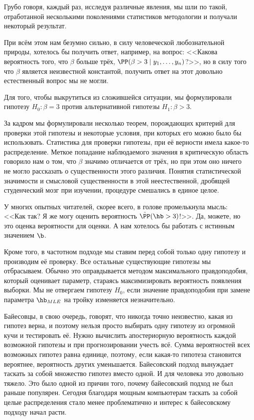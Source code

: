 Грубо говоря, каждый раз, исследуя различные явления, мы шли по такой, отработанной несколькими поколениями статистиков методологии и получали некоторый результат.

При всём этом нам безумно сильно, в силу человеческой любознательной природы, хотелось бы получить ответ, например, на вопрос: <<Какова вероятность того, что $\beta$ больше трёх, $\PP(\beta > 3 \mid y_1, \ldots, y_n)$?>>, но в силу того что $\beta$ является неизвестной константой, получить ответ на этот довольно естественный вопрос мы не могли.

Для того, чтобы выкрутиться из сложившейся ситуации, мы формулировали гипотезу $ H_0 : \beta = 3 $ против альтернативной гипотезы $ H_1 : \beta > 3.$

За кадром мы формулировали  несколько теорем, порождающих критерий для проверки этой гипотезы и некоторые условия, при которых его можно было бы использовать. Статистика для проверки гипотезы, при её верности имела какое-то распределение. Меткое попадание наблюдаемого значения в критическую область говорило нам о том, что $\beta$ значимо отличается от трёх, но при этом оно ничего не могло  рассказать о существенности этого различия. Понятия статистической значимости и смысловой существенности в этой неестественной, дробящей студенческий мозг при изучении, процедуре смешались в единое целое.

У многих опытных читателей, скорее всего, в голове промелькнула мысль: <<Как так? Я же могу оценить вероятность $\hat{\PP} ( \hb > 3)$!>>.  Да, можете, но это оценка вероятности для оценки. А нам хотелось бы работать с истинным значением $\b$.

Кроме того, в частотном подходе мы ставим перед собой только одну гипотезу и производим её проверку. Все остальные существующие гипотезы мы отбрасываем. Обычно это оправдывается методом максимального правдоподобия, который оценивает параметр, стараясь максимизировать вероятность появления выборки. Мы не отвергаем гипотезу $H_0$, если значение правдоподобия при замене параметра $\hb_{MLE}$ на тройку изменяется незначительно.

Байесовцы, в свою очередь, говорят, что никогда точно неизвестно, какая из гипотез верна, и поэтому нельзя просто выбирать одну гипотезу из огромной кучи и тестировать её. Нужно вычислить апостериорную вероятность каждой возможной гипотезы и при прогнозировании учесть всё. Сумма вероятностей всех возможных гипотез равна единице, поэтому, если какая-то гипотеза становится вероятнее, вероятность других уменьшается. Байесовский подход вынуждает таскать за собой множество гипотез вместо одной. И для человека это довольно тяжело. Это было одной из причин того, почему байесовский подход не был раньше популярен. Сегодня благодаря мощным компьютерам таскать за собой целые распределения стало менее проблематично и интерес к байесовскому подходу начал расти.

